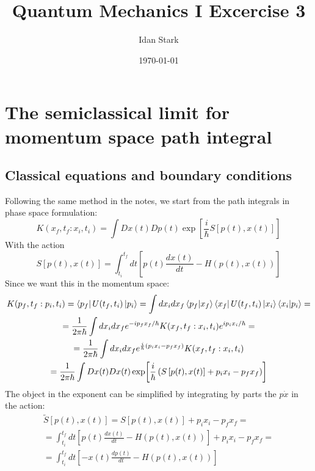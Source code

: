\documentclass{article}
\title{Quantum Mechanics I Excercise 3}
\author{Idan Stark}
\date{\today}
\begin{document}
\maketitle

\section{The semiclassical limit for momentum space path integral}
\subsection{Classical equations and boundary conditions}
Following the same method in the notes, we start from the path integrals in phase space formulation:
\begin{equation}
    K(x_f, t_f : x_i, t_i) = \int Dx(t) Dp(t) \exp[\frac{i}{\hbar}S\left[p(t), x(t)\right]]
\end{equation}
With the action
\begin{equation}
    S\left[p(t), x(t)\right] = \int_{t_i}^{t_f} dt \left[p(t) \frac{dx(t)}{dt} - H(p(t), x(t))\right]
\end{equation}
Since we want this in the momentum space:
\begin{equation}
\begin{gathered}
    K(p_f, t_f : p_i, t_i) = \bra{p_f}U(t_f, t_i)\ket{p_i} =
    \int dx_i dx_f \bra{p_f}\ket{x_f}\bra{x_f}U(t_f, t_i)\ket{x_i}\bra{x_i}\ket{p_i} =
    \\
    = \frac{1}{2\pi\hbar}\int dx_i dx_f e^{-ip_fx_f/\hbar}K(x_f, t_f : x_i, t_i)e^{ip_ix_i/\hbar} =
    \\
    = \frac{1}{2\pi\hbar}\int dx_i dx_f e^{\frac{i}{\hbar}(p_ix_i - p_fx_f)}K(x_f, t_f : x_i, t_i)
    \\
    = \frac{1}{2\pi\hbar}\int Dx(t) Dx(t) \exp[\frac{i}{\hbar}\left(S\left[p(t), x(t)\right] + p_ix_i - p_fx_f\right)]
\end{gathered}
\end{equation}
The object in the exponent can be simplified by integrating by parts the $p\dot{x}$ in the action:
\begin{equation}
\begin{gathered}
\label{eq:first-action}
    \tilde{S}\left[p(t), x(t)\right] = S\left[p(t), x(t)\right] + p_ix_i - p_fx_f =
    \\
    = \int_{t_i}^{t_f} dt \left[p(t) \frac{dx(t)}{dt} - H(p(t), x(t))\right] + p_ix_i - p_fx_f = 
    \\
    = \int_{t_i}^{t_f} dt \left[-x(t) \frac{dp(t)}{dt} - H(p(t), x(t))\right]
\end{gathered}
\end{equation}
\end{document}

